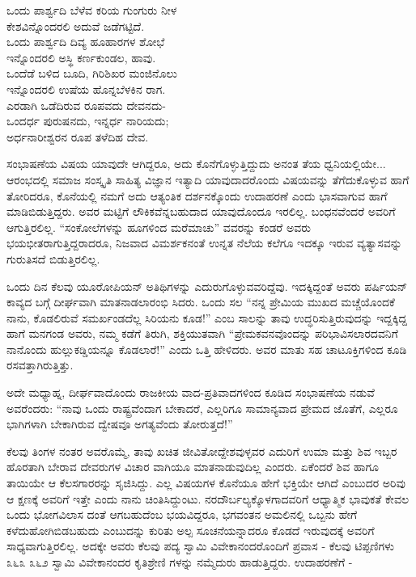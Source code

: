 \begin{myquote}
ಒಂದು ಪಾರ್ಶ್ವದಿ ಬೆಳೆವ ಕರಿಯ ಗುಂಗುರು ನೀಳ\\ಕೇಶವಿನ್ನೊಂದರಲಿ ಅದುವೆ ಜಡೆಗಟ್ಟಿದೆ.\\ಒಂದು ಪಾರ್ಶ್ವದಿ ದಿವ್ಯ ಹೂಹಾರಗಳ ಶೋಭೆ\\ಇನ್ನೊಂದರಲಿ ಅಸ್ಥಿ ಕರ್ಣಕುಂಡಲ, ಹಾವು.\\ಒಂದೆಡೆ ಬಳಿದ ಬೂದಿ, ಗಿರಿಶಿಖರ ಮಂಜಿನೊಲು\\ಇನ್ನೊಂದರಲಿ ಉಷೆಯ ಹೊನ್ನಬೆಳಕಿನ ರಾಗ.\\ಎರಡಾಗಿ ಒಡೆದಿರುವ ರೂಪವದು ದೇವನದು-\\ಒಂದರ್ಧ ಪುರುಷನದು, ಇನ್ನರ್ಧ ನಾರಿಯದು;\\ಅರ್ಧನಾರೀಶ್ವರನ ರೂಪ ತಳೆದಿಹ ದೇವ.
\end{myquote}

ಸಂಭಾಷಣೆಯ ವಿಷಯ ಯಾವುದೇ ಆಗಿದ್ದರೂ, ಅದು ಕೊನೆಗೊಳ್ಳುತ್ತಿದ್ದುದು ಅನಂತ ತೆಯ ಧ್ವನಿಯಲ್ಲಿಯೇ... ಆರಂಭದಲ್ಲಿ ಸಮಾಜ ಸಂಸ್ಕೃತಿ ಸಾಹಿತ್ಯ ವಿಜ್ಞಾನ ಇತ್ಯಾದಿ ಯಾವುದಾದರೊಂದು ವಿಷಯವನ್ನು ತೆಗೆದುಕೊಳ್ಳುವ ಹಾಗೆ ತೋರಿದರೂ, ಕೊನೆಯಲ್ಲಿ ನಮಗೆ ಅದು ಆತ್ಯಂತಿಕ ದರ್ಶನಕ್ಕೊಂದು ಉದಾಹರಣೆ ಎಂದು ಭಾಸವಾಗುವ ಹಾಗೆ ಮಾಡಿಬಿಡುತ್ತಿದ್ದರು. ಅವರ ಮಟ್ಟಿಗೆ ಲೌಕಿಕವೆನ್ನಬಹುದಾದ ಯಾವುದೊಂದೂ ಇರಲಿಲ್ಲ. ಬಂಧನವೆಂದರೆ ಅವರಿಗೆ ಆಗುತ್ತಿರಲಿಲ್ಲ. “ಸಂಕೋಲೆಗಳನ್ನು ಹೂಗಳಿಂದ ಮರೆಮಾಚು” ವವರನ್ನು ಕಂಡರೆ ಅವರು ಭಯಭೀತರಾಗುತ್ತಿದ್ದರಾದರೂ, ನಿಜವಾದ ವಿಮರ್ಶಕನಂತೆ ಉನ್ನತ ನೆಲೆಯ ಕಲೆಗೂ ಇದಕ್ಕೂ ಇರುವ ವ್ಯತ್ಯಾಸವನ್ನು ಗುರುತಿಸದೆ ಬಿಡುತ್ತಿರಲಿಲ್ಲ.

ಒಂದು ದಿನ ಕೆಲವು ಯೂರೋಪಿಯನ್ ಅತಿಥಿಗಳನ್ನು ಎದುರುಗೊಳ್ಳುವವರಿದ್ದೆವು. ಇದಕ್ಕಿದ್ದಂತೆ ಅವರು ಪರ್ಷಿಯನ್ ಕಾವ್ಯದ ಬಗ್ಗೆ ದೀರ್ಘವಾಗಿ ಮಾತನಾಡಲಾರಂಭಿ ಸಿದರು. ಒಂದು ಸಲ “ನನ್ನ ಪ್ರೇಮಿಯ ಮುಖದ ಮಚ್ಚೆಯೊಂದಕೆ ನಾನು, ಕೊಡಲಿರುವೆ ಸಮರ್ಖಂಡದೆಲ್ಲ ಸಿರಿಯನು ಕೂಡ!” ಎಂಬ ಸಾಲನ್ನು ತಾವು ಉದ್ಧರಿಸುತ್ತಿರುವುದನ್ನು ಇದ್ದಕ್ಕಿದ್ದ ಹಾಗೆ ಮನಗಂಡ ಅವರು, ನಮ್ಮ ಕಡೆಗೆ ತಿರುಗಿ, ಶಕ್ತಿಯುತವಾಗಿ “ಪ್ರೇಮಕವನವೊಂದನ್ನು ಪರಿಭಾವಿಸಲಾರದವನಿಗೆ ನಾನೊಂದು ಹುಲ್ಲುಕಡ್ಡಿಯನ್ನೂ ಕೊಡಲಾರೆ!” ಎಂದು ಒತ್ತಿ ಹೇಳಿದರು. ಅವರ ಮಾತು ಸಹ ಚಾಟೂಕ್ತಿಗಳಿಂದ ಕೂಡಿ ರಸವತ್ತಾಗಿರುತ್ತಿತ್ತು.

ಅದೇ ಮಧ್ಯಾಹ್ನ, ದೀರ್ಘವಾದೊಂದು ರಾಜಕೀಯ ವಾದ-ಪ್ರತಿವಾದಗಳಿಂದ ಕೂಡಿದ ಸಂಭಾಷಣೆಯ ನಡುವೆ ಅವರೆಂದರು: “ನಾವು ಒಂದು ರಾಷ್ಟ್ರವೆಂದಾಗ ಬೇಕಾದರೆ, ಎಲ್ಲರಿಗೂ ಸಾಮಾನ್ಯವಾದ ಪ್ರೇಮದ ಜೊತೆಗೆ, ಎಲ್ಲರೂ ಭಾಗಿಗಳಾಗಿ ಬೇಕಾಗಿರುವ ದ್ವೇಷವೂ ಅಗತ್ಯವೆಂದು ತೋರುತ್ತದೆ!”

ಕೆಲವು ತಿಂಗಳ ನಂತರ ಅವರೊಮ್ಮೆ, ತಾವು ಖಚಿತ ಜೀವಿತೋದ್ದೇಶವುಳ್ಳವರ ಎದುರಿಗೆ ಉಮಾ ಮತ್ತು ಶಿವ ಇಬ್ಬರ ಹೊರತಾಗಿ ಬೇರಾವ ದೇವರುಗಳ ವಿಚಾರ ವಾಗಿಯೂ ಮಾತನಾಡುವುದಿಲ್ಲ ಎಂದರು. ಏಕೆಂದರೆ ಶಿವ ಹಾಗೂ ತಾಯಿಯೇ ಆ ಕೆಲಸಗಾರರನ್ನು ಸೃಜಿಸಿದ್ದು. ಎಲ್ಲ ವಿಷಯಗಳ ಕೊನೆಯೂ ಹೇಗೆ ಭಕ್ತಿಯೇ ಆಗಿದೆ ಎಂಬುದರ ಅರಿವು ಆ ಕ್ಷಣಕ್ಕೆ ಅವರಿಗೆ ಇತ್ತೇ ಎಂದು ನಾನು ಚಿಂತಿಸಿದ್ದುಂಟು. ನರದೌರ್ಬಲ್ಯಕ್ಕೊಳಗಾದವರಿಗೆ ಆಧ್ಯಾತ್ಮಿಕ ಭಾವುಕತೆ ಕೇವಲ ಒಂದು ಭೋಗವಿಲಾಸ ದಂತೆ ಆಗಬಹುದೆಂಬ ಭಯವಿದ್ದರೂ, ಭಗವಂತನ ಅಮಲಿನಲ್ಲಿ ಒಬ್ಬನು ಹೇಗೆ ಕಳೆದುಹೋಗಿಬಿಡಬಹುದು ಎಂಬುದನ್ನು ಕುರಿತು ಅಲ್ಪ ಸೂಚನೆಯನ್ನಾದರೂ ಕೊಡದೆ ಇರುವುದಕ್ಕೆ ಅವರಿಗೆ ಸಾಧ್ಯವಾಗುತ್ತಿರಲಿಲ್ಲ. ಅದಕ್ಕೇ ಅವರು ಕೆಲವು ಪದ್ಯ ಸ್ವಾಮಿ ವಿವೇಕಾನಂದರೊಂದಿಗೆ ಪ್ರವಾಸ - ಕೆಲವು ಟಿಪ್ಪಣಿಗಳು ೩೬೩ ೩೬೨ ಸ್ವಾಮಿ ವಿವೇಕಾನಂದರ ಕೃತಿಶ್ರೇಣಿ ಗಳನ್ನು ನಮ್ಮೆದುರು ಹಾಡುತ್ತಿದ್ದರು. ಉದಾಹರಣೆಗೆ -

